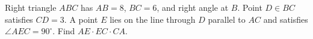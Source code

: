 Right triangle $ ABC $ has $ AB=8 $, $ BC=6 $, and right angle at $ B $. Point $ D\in BC $ satisfies $ CD=3 $. A point $ E $ lies on the line through $ D $ parallel to $ AC $ and satisfies $\angle AEC=90^\circ $. Find $ AE\cdot EC\cdot CA $.
